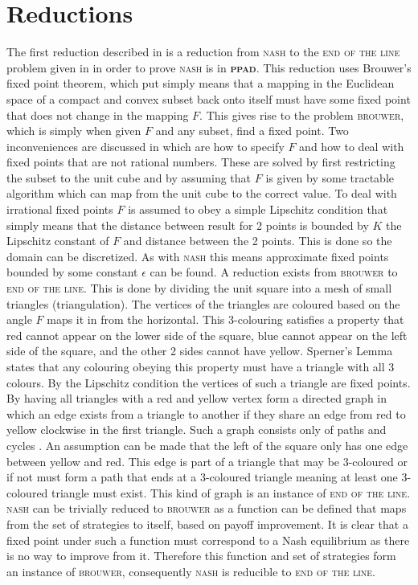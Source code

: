 \documentclass{article}
\begin{document}
\section{Reductions}
The first reduction described in \cite{Daskalakis.2009} is a reduction from \textsc{nash} to the \textsc{end of the line} problem given in \cite{Daskalakis.2009} in order to prove \textsc{nash} is in \textbf{\textsc{ppad}}. This reduction uses Brouwer's fixed point theorem, which put simply means that a mapping in the Euclidean space of a compact and convex subset back onto itself must have some fixed point that does not change in the mapping $F$. This gives rise to the problem \textsc{brouwer}, which is simply when given $F$ and any subset, find a fixed point. Two inconveniences are discussed in \cite{Daskalakis.2009} which are how to specify $F$ and how to deal with fixed points that are not rational numbers. These are solved by first restricting the subset to the unit cube and by assuming that $F$ is given by some tractable algorithm which can map from the unit cube to the correct value. To deal with irrational fixed points $F$ is assumed to obey a simple Lipschitz condition that simply means that the distance between result for 2 points is bounded by $K$ the Lipschitz constant of $F$ and distance between the 2 points. This is done so the domain can be discretized. As with \textsc{nash} this means approximate fixed points bounded by some constant $\epsilon$ can be found. A reduction exists from \textsc{brouwer} to \textsc{end of the line}\cite{Daskalakis.2009}. This is done by dividing the unit square into a mesh of small triangles (triangulation). The vertices of the triangles are coloured based on the angle $F$ maps it in from the horizontal. This 3-colouring satisfies a property that red cannot appear on the lower side of the square, blue cannot appear on the left side of the square, and the other 2 sides cannot have yellow. Sperner's Lemma states that any colouring obeying this property must have a triangle with all 3 colours. By the Lipschitz condition the vertices of such a triangle are fixed points. By having all triangles with a red and yellow vertex form a directed graph in which an edge exists from a triangle to another if they share an edge from red to yellow clockwise in the first triangle. Such a graph consists only of paths and cycles \cite{Daskalakis.2009}. An assumption can be made that the left of the square only has one edge between yellow and red. This edge is part of a triangle that may be 3-coloured or if not must form a path that ends at a 3-coloured triangle meaning at least one 3-coloured triangle must exist. This kind of graph is an instance of \textsc{end of the line}\cite{Daskalakis.2009}. \textsc{nash} can be trivially reduced to \textsc{brouwer} as a function can be defined that maps from the set of strategies to itself, based on payoff improvement. It is clear that a fixed point under such a function must correspond to a Nash equilibrium as there is no way to improve from it. Therefore this function and set of strategies form an instance of \textsc{brouwer}, consequently \textsc{nash} is reducible to \textsc{end of the line}.\par
\end{document}

